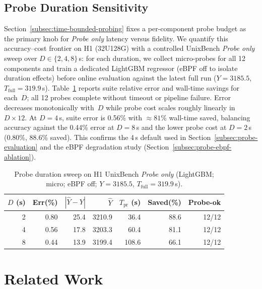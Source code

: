 \documentclass[sigplan,10pt]{acmart}
\begin{document}
\subsection{Probe Duration Sensitivity}
\label{subsec:probe-duration-sensitivity}

Section~\ref{subsec:time-bounded-probing} fixes a per-component probe budget as the primary knob for \emph{Probe only} latency versus fidelity.
We quantify this accuracy--cost frontier on H1 (32U128G) with a controlled UnixBench \emph{Probe only} sweep over $D \in \{2,4,8\}$\,s: for each duration, we collect micro-probes for all 12 components and train a dedicated LightGBM regressor (eBPF off to isolate duration effects) before online evaluation against the latest full run ($Y{=}3185.5$, $T_{\mathrm{full}}{=}319.9$\,s).
Table~\ref{tab:probe-duration-sensitivity} reports suite relative error and wall-time savings for each~$D$; all 12 probes complete without timeout or pipeline failure.
Error decreases monotonically with~$D$ while probe cost scales roughly linearly in $D{\times}12$. At $D{=}4$\,s, suite error is 0.56\% with ${\approx}81\%$ wall-time saved, balancing accuracy against the 0.44\% error at $D{=}8$\,s and the lower probe cost at $D{=}2$\,s (0.80\%, 88.6\% saved).
This confirms the 4\,s default used in Section~\ref{subsec:probe-evaluation} and the eBPF degradation study (Section~\ref{subsec:probe-ebpf-ablation}).

\begin{table}[t]
\centering
\caption{Probe duration sweep on H1 UnixBench \emph{Probe only} (LightGBM; micro; eBPF off; $Y{=}3185.5$, $T_{\mathrm{full}}{=}319.9$\,s).}
\label{tab:probe-duration-sensitivity}
\small
\begin{tabular*}{\columnwidth}{@{\extracolsep{\fill}}rrrrrrr@{}}
\toprule
$D$ (s) & \textbf{Err(\%)} & $|\hat{Y}{-}Y|$ & $\hat{Y}$ & $T_{\mathrm{pr}}$ (s) & \textbf{Saved(\%)} & \textbf{Probe-ok} \\
\midrule
2 & 0.80 & 25.4 & 3210.9 & 36.4 & 88.6 & 12/12 \\
4 & 0.56 & 17.8 & 3203.3 & 60.4 & 81.1 & 12/12 \\
8 & 0.44 & 13.9 & 3199.4 & 108.6 & 66.1 & 12/12 \\
\bottomrule
\end{tabular*}
\end{table}


\section{Related Work}
\end{document}
